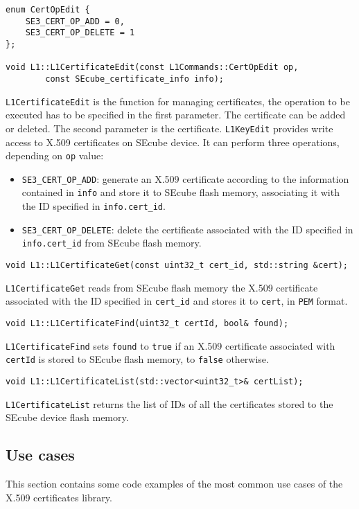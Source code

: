 \begin{lstlisting}
enum CertOpEdit {
	SE3_CERT_OP_ADD = 0,
	SE3_CERT_OP_DELETE = 1
};
	
void L1::L1CertificateEdit(const L1Commands::CertOpEdit op,
		const SEcube_certificate_info info);
\end{lstlisting}
\texttt{L1CertificateEdit} is the function for managing certificates, the
operation to be executed has to be specified in the first parameter. The
certificate can be added or deleted.
The second parameter is the certificate.
\texttt{L1KeyEdit} provides write access to X.509 certificates on SEcube device.
It can perform three operations, depending on \texttt{op} value:
\begin{itemize}
	\item \texttt{SE3\_CERT\_OP\_ADD}: generate an X.509 certificate according
		to the information contained in \texttt{info} and store it to SEcube
		flash memory, associating it with the ID specified in
		\texttt{info.cert\_id}.
	\item \texttt{SE3\_CERT\_OP\_DELETE}: delete the certificate associated
		with the ID specified in \texttt{info.cert\_id} from SEcube flash
		memory.
\end{itemize}

\begin{lstlisting}
void L1::L1CertificateGet(const uint32_t cert_id, std::string &cert);
\end{lstlisting}
\texttt{L1CertificateGet} reads from SEcube flash memory the X.509 certificate
associated with the ID specified in \texttt{cert\_id} and stores it to
\texttt{cert}, in \texttt{PEM} format.

\begin{lstlisting}
void L1::L1CertificateFind(uint32_t certId, bool& found);
\end{lstlisting}
\texttt{L1CertificateFind} sets \texttt{found} to \texttt{true} if an X.509
certificate associated with \texttt{certId} is stored to SEcube flash memory,
to \texttt{false} otherwise.

\begin{lstlisting}
void L1::L1CertificateList(std::vector<uint32_t>& certList);
\end{lstlisting}
\texttt{L1CertificateList} returns the list of IDs of all the certificates
stored to the SEcube device flash memory.

\subsection{Use cases}
This section contains some code examples of the most common use cases of the
X.509 certificates library.

